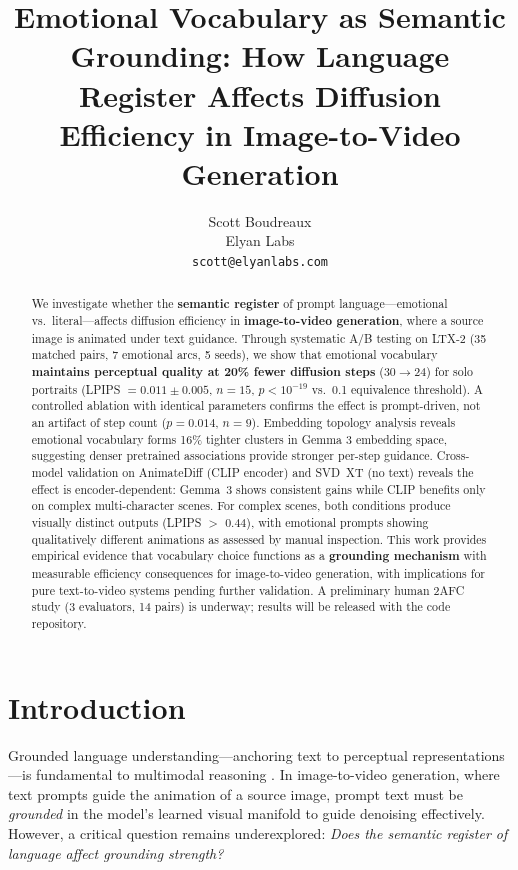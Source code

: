 \documentclass[10pt,twocolumn,letterpaper]{article}
\begin{document}
\title{Emotional Vocabulary as Semantic Grounding: How Language Register Affects Diffusion Efficiency in Image-to-Video Generation}

\author{Scott Boudreaux\\
Elyan Labs\\
{\tt\small scott@elyanlabs.com}
}

\maketitle

\begin{abstract}
We investigate whether the \textbf{semantic register} of prompt language---emotional vs.\ literal---affects diffusion efficiency in \textbf{image-to-video generation}, where a source image is animated under text guidance. Through systematic A/B testing on LTX-2 (35 matched pairs, 7 emotional arcs, 5 seeds), we show that emotional vocabulary \textbf{maintains perceptual quality at 20\% fewer diffusion steps} (30$\rightarrow$24) for solo portraits (LPIPS $= 0.011 \pm 0.005$, $n{=}15$, $p < 10^{-19}$ vs.\ 0.1 equivalence threshold). A controlled ablation with identical parameters confirms the effect is prompt-driven, not an artifact of step count ($p = 0.014$, $n{=}9$). Embedding topology analysis reveals emotional vocabulary forms 16\% tighter clusters in Gemma 3 embedding space, suggesting denser pretrained associations provide stronger per-step guidance. Cross-model validation on AnimateDiff (CLIP encoder) and SVD~XT (no text) reveals the effect is encoder-dependent: Gemma~3 shows consistent gains while CLIP benefits only on complex multi-character scenes. For complex scenes, both conditions produce visually distinct outputs (LPIPS $>$ 0.44), with emotional prompts showing qualitatively different animations as assessed by manual inspection. This work provides empirical evidence that vocabulary choice functions as a \textbf{grounding mechanism} with measurable efficiency consequences for image-to-video generation, with implications for pure text-to-video systems pending further validation. A preliminary human 2AFC study (3 evaluators, 14 pairs) is underway; results will be released with the code repository.
\end{abstract}

\section{Introduction}

Grounded language understanding---anchoring text to perceptual representations---is fundamental to multimodal reasoning \cite{bisk2020}. In image-to-video generation, where text prompts guide the animation of a source image, prompt text must be \textit{grounded} in the model's learned visual manifold to guide denoising effectively. However, a critical question remains underexplored: \textit{Does the semantic register of language affect grounding strength?}
\end{document}
